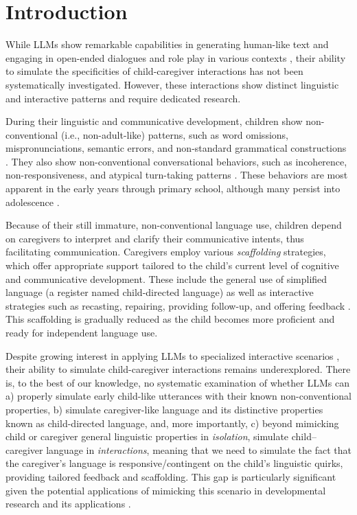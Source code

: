 \graphicspath{{ch4/papers/LLM_benchmark/}}

\section{Introduction}

While LLMs show remarkable capabilities in generating human-like text and engaging in open-ended dialogues and role play in various contexts \citep{feng2024can, yang2024talk2care}, their ability to simulate the specificities of child-caregiver interactions has not been systematically investigated. However, these interactions show distinct linguistic and interactive patterns and require dedicated research. 

During their linguistic and communicative development,  children show non-conventional (i.e., non-adult-like) patterns, such as word omissions, mispronunciations, semantic errors, and non-standard grammatical constructions \citep{bloom1993transition}. They also show non-conventional conversational behaviors, such as incoherence, non-responsiveness, and atypical turn-taking patterns \citep{ninio1996pragmatic}. These behaviors are most apparent in the early years through primary school, although many persist into adolescence \citep{nippold2016later}.  

Because of their still immature, non-conventional language use, children depend on caregivers to interpret and clarify their communicative intents, thus facilitating communication. Caregivers employ various \textit{scaffolding} strategies, which offer appropriate support tailored to the child's current level of cognitive and communicative development. These include the general use of simplified language (a register named child-directed language) as well as interactive strategies such as recasting, repairing, providing follow-up, and offering feedback \citep{berk1995scaffolding, clark2020conversational, snow1977talking,nikolaus2023communicative, soderstrom2007beyond}. This scaffolding is gradually reduced as the child becomes more proficient and ready for independent language use.

Despite growing interest in applying LLMs to specialized interactive scenarios \citep{feng2024can, yang2024talk2care}, their ability to simulate child-caregiver interactions remains underexplored. There is, to the best of our knowledge, no systematic examination of whether LLMs can a) properly simulate early child-like utterances with their known non-conventional properties, b) simulate caregiver-like language and its distinctive properties known as child-directed language, and, more importantly, c) beyond mimicking child or caregiver general linguistic properties in \textit{isolation}, simulate child–caregiver language in \textit{interactions}, meaning that we need to simulate the fact that the caregiver's language is responsive/contingent on the child's linguistic quirks, providing tailored feedback and scaffolding. This gap is particularly significant given the potential applications of mimicking this scenario in developmental research and its applications \citep{zhang2024mathemyths, seo2024chacha, rasanen2024age,feng2024can}.

